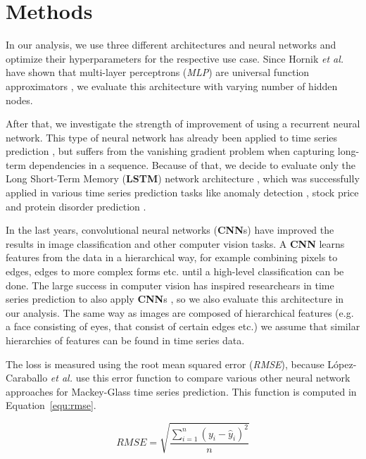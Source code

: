 

\section{Methods}

In our analysis, we use three different architectures and neural networks and
optimize their hyperparameters for the respective use case. Since Hornik
\textit{et al.} have shown that multi-layer perceptrons (\emph{MLP})
are universal
function approximators \cite{hornik1989}, we evaluate this architecture with
varying number of hidden nodes.

After that, we investigate the strength of
improvement of using a recurrent neural network. This type of neural network has
already been applied to time series prediction \cite{connor1994}, but suffers
from the vanishing gradient problem when capturing long-term dependencies in a
sequence. Because of that, we decide to evaluate only the Long Short-Term Memory
(\textbf{LSTM})
network architecture \cite{hochreiter1997}, which was successfully applied in
various time series prediction tasks like anomaly detection \cite{malhotra2015},
stock price \cite{fischer2018} and protein disorder prediction
\cite{hanson2016}.

In the last years, convolutional neural networks (\textbf{CNN}s) have improved
the results in image classification \cite{krizhevsky2012} and other computer
vision tasks. A \textbf{CNN} learns features from the data in a hierarchical
way, for example combining pixels to edges, edges to more complex forms etc.
until a high-level classification can be done. The large success in computer
vision has inspired researchears in time series prediction to also apply
\textbf{CNN}s \cite{cui2016, borovykh2017}, so we also evaluate this
architecture in our analysis. The same way as images are composed of
hierarchical features (e.g. a face consisting of eyes, that consist of
certain edges etc.) we assume that similar hierarchies of features can be found
in time series data.

The loss is measured using the root mean squared error (\emph{RMSE}), because
López-Caraballo \textit{et al.} \cite{lopez2016} use this error function to
compare various other neural network approaches for Mackey-Glass time series
prediction. This function is computed in Equation~\ref{equ:rmse}.

\begin{equation}
    RMSE = \sqrt{\frac{\sum_{i=1}^n (y_i - \hat{y}_i)^2}{n}}
    \label{equ:rmse}
\end{equation}

